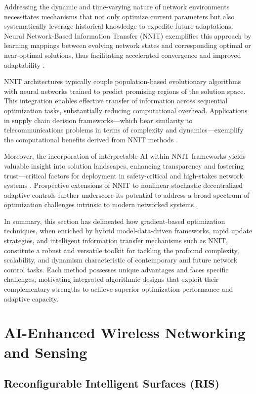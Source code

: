 Addressing the dynamic and time-varying nature of network environments necessitates mechanisms that not only optimize current parameters but also systematically leverage historical knowledge to expedite future adaptations. Neural Network-Based Information Transfer (NNIT) exemplifies this approach by learning mappings between evolving network states and corresponding optimal or near-optimal solutions, thus facilitating accelerated convergence and improved adaptability \cite{ref38,ref39,ref40,ref47}.

NNIT architectures typically couple population-based evolutionary algorithms with neural networks trained to predict promising regions of the solution space. This integration enables effective transfer of information across sequential optimization tasks, substantially reducing computational overhead. Applications in supply chain decision frameworks—which bear similarity to telecommunications problems in terms of complexity and dynamics—exemplify the computational benefits derived from NNIT methods \cite{ref38}.

Moreover, the incorporation of interpretable AI within NNIT frameworks yields valuable insight into solution landscapes, enhancing transparency and fostering trust—critical factors for deployment in safety-critical and high-stakes network systems \cite{ref39}. Prospective extensions of NNIT to nonlinear stochastic decentralized adaptive controls further underscore its potential to address a broad spectrum of optimization challenges intrinsic to modern networked systems \cite{ref40}.

In summary, this section has delineated how gradient-based optimization techniques, when enriched by hybrid model-data-driven frameworks, rapid update strategies, and intelligent information transfer mechanisms such as NNIT, constitute a robust and versatile toolkit for tackling the profound complexity, scalability, and dynamism characteristic of contemporary and future network control tasks. Each method possesses unique advantages and faces specific challenges, motivating integrated algorithmic designs that exploit their complementary strengths to achieve superior optimization performance and adaptive capacity.

\section{AI-Enhanced Wireless Networking and Sensing}

\subsection{Reconfigurable Intelligent Surfaces (RIS)}

